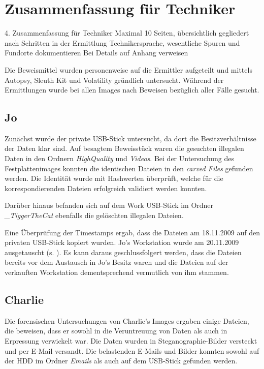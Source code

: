 \chapter{Zusammenfassung für Techniker}
\label{sec:tec}


4. Zusammenfassung für Techniker
Maximal 10 Seiten, übersichtlich gegliedert nach Schritten in der Ermittlung
Technikersprache, wesentliche Spuren und Fundorte dokumentieren
Bei Details auf Anhang verweisen

Die Beweismittel wurden personenweise auf die Ermittler aufgeteilt und mittels Autopsy, Sleuth Kit und Volatility gründlich untersucht. Während der Ermittlungen wurde bei allen Images nach Beweisen bezüglich aller Fälle gesucht.

\section{Jo}
\label{sec:jo}
Zunächst wurde der private USB-Stick untersucht, da dort die Besitzverhältnisse der Daten klar sind. Auf besagtem Beweisstück waren die gesuchten illegalen Daten in den Ordnern \textit{HighQuality} und \textit{Videos}. Bei der Untersuchung des Festplattenimages konnten die identischen Dateien in den \textit{carved Files} gefunden werden. Die Identität wurde mit Hashwerten überprüft, welche für die korrespondierenden Dateien erfolgreich validiert werden konnten. 

Darüber hinaus befanden sich auf dem Work USB-Stick im Ordner \textit{_TiggerTheCat} ebenfalls die gelöschten illegalen Dateien.

Eine Überprüfung der Timestamps ergab, dass die Dateien am 18.11.2009 auf den privaten USB-Stick kopiert wurden. Jo's Workstation wurde am 20.11.2009 ausgetauscht (s. ). Es kann daraus geschlussfolgert werden, dass die Dateien bereits vor dem Austausch in Jo's Besitz waren und die Dateien auf der verkauften Workstation  dementsprechend vermutlich von ihm stammen.

\section{Charlie}
\label{sec:charlie}
Die forensischen Untersuchungen von Charlie's Images ergaben einige Dateien, die beweisen, dass er sowohl in die Veruntreuung von Daten als auch in Erpressung verwickelt war. Die Daten wurden in Steganographie-Bilder versteckt und per E-Mail versandt. Die belastenden E-Mails und Bilder konnten sowohl auf der HDD im Ordner \textit{Emails} als auch auf dem USB-Stick gefunden werden. 

